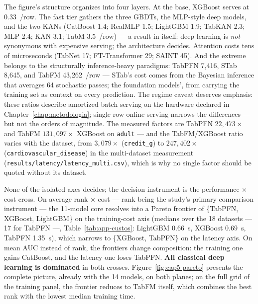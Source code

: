 The figure's structure organizes into four layers. At the base,
XGBoost serves at 0.33~\us/row. The fast tier gathers the three
GBDTs, the MLP-style deep models, and the two KANs (CatBoost 1.4;
RealMLP 1.5; LightGBM 1.9; TabKAN 2.3; MLP 2.4; KAN 3.1; TabM
3.5~\us/row) --- a result in itself: deep learning is \emph{not}
synonymous with expensive serving; the architecture decides.
Attention costs tens of microseconds (TabNet 17; FT-Transformer 29;
SAINT 45). And the extreme belongs to the structurally
inference-heavy paradigms: TabPFN 7{,}416, STab 8{,}645, and TabFM
43{,}262~\us/row --- STab's cost comes from the Bayesian inference
that averages 64 stochastic passes; the foundation models', from
carrying the training set as context on every prediction. The regime
caveat deserves emphasis: these ratios describe amortized batch
serving on the hardware declared in Chapter~\ref{chap:metodologia};
single-row online serving narrows the differences --- but not the
orders of magnitude. The measured factors are TabPFN $22{,}473\times$
and TabFM $131{,}097\times$ XGBoost on \texttt{adult} --- and the
TabFM/XGBoost ratio varies with the dataset, from $3{,}079\times$
(\texttt{credit\_g}) to $247{,}402\times$
(\texttt{cardiovascular\_\allowbreak disease}) in the multi-dataset
measurement
(\texttt{results/\allowbreak latency/\allowbreak latency\_\allowbreak multi.csv}),
which is why no single factor should be quoted without its dataset.

None of the isolated axes decides; the decision instrument is the
performance $\times$ cost cross. On average rank $\times$ cost ---
rank being the study's primary comparison instrument --- the 11-model
core resolves into a Pareto frontier of \{TabPFN, XGBoost, LightGBM\}
on the training-cost axis (medians over the 18 datasets --- 17 for
TabPFN ---,
Table~\ref{tab:app-custos}: LightGBM 0.66~s, XGBoost 0.69~s, TabPFN
1.35~s), which narrows to \{XGBoost, TabPFN\} on the latency axis.
On mean AUC instead of rank, the frontiers change composition: the
training one gains CatBoost, and the latency one loses TabPFN.
\textbf{All classical deep
learning is dominated} in both crosses.
Figure~\ref{fig:cap5-pareto} presents the complete picture, already
with the 14 models, on both planes; on the full grid of the training
panel, the frontier reduces to TabFM itself, which combines the best
rank with the lowest median training time.

